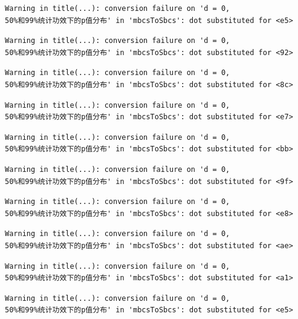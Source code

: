 \documentclass[
  letterpaper,
  DIV=11,
  numbers=noendperiod]{scrreprt}
\begin{document}
\begin{verbatim}
Warning in title(...): conversion failure on 'd = 0,
50%和99%统计功效下的p值分布' in 'mbcsToSbcs': dot substituted for <e5>
\end{verbatim}

\begin{verbatim}
Warning in title(...): conversion failure on 'd = 0,
50%和99%统计功效下的p值分布' in 'mbcsToSbcs': dot substituted for <92>
\end{verbatim}

\begin{verbatim}
Warning in title(...): conversion failure on 'd = 0,
50%和99%统计功效下的p值分布' in 'mbcsToSbcs': dot substituted for <8c>
\end{verbatim}

\begin{verbatim}
Warning in title(...): conversion failure on 'd = 0,
50%和99%统计功效下的p值分布' in 'mbcsToSbcs': dot substituted for <e7>
\end{verbatim}

\begin{verbatim}
Warning in title(...): conversion failure on 'd = 0,
50%和99%统计功效下的p值分布' in 'mbcsToSbcs': dot substituted for <bb>
\end{verbatim}

\begin{verbatim}
Warning in title(...): conversion failure on 'd = 0,
50%和99%统计功效下的p值分布' in 'mbcsToSbcs': dot substituted for <9f>
\end{verbatim}

\begin{verbatim}
Warning in title(...): conversion failure on 'd = 0,
50%和99%统计功效下的p值分布' in 'mbcsToSbcs': dot substituted for <e8>
\end{verbatim}

\begin{verbatim}
Warning in title(...): conversion failure on 'd = 0,
50%和99%统计功效下的p值分布' in 'mbcsToSbcs': dot substituted for <ae>
\end{verbatim}

\begin{verbatim}
Warning in title(...): conversion failure on 'd = 0,
50%和99%统计功效下的p值分布' in 'mbcsToSbcs': dot substituted for <a1>
\end{verbatim}

\begin{verbatim}
Warning in title(...): conversion failure on 'd = 0,
50%和99%统计功效下的p值分布' in 'mbcsToSbcs': dot substituted for <e5>
\end{verbatim}
\end{document}
